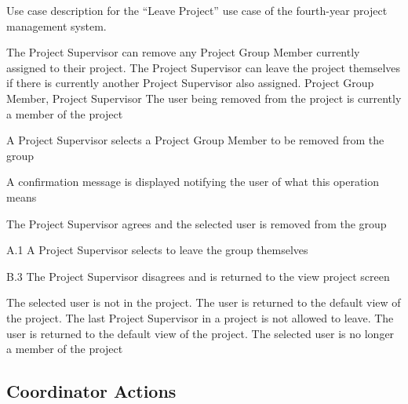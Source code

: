 \documentclass[document.tex]{subfiles}
\begin{document}
\begin{table}
  \centering
  \caption{Use case description for the ``Leave Project'' use case of the fourth-year project management system.}
  \label{tbl:use-case-leave-project}

  \begin{usecase}
    The Project Supervisor can remove any Project Group Member currently assigned to their project. The Project Supervisor can leave the project themselves if there is currently another Project Supervisor also assigned.
    Project Group Member, Project Supervisor
    The user being removed from the project is currently a member of the project
    \ucnormal
    \begin{ucenum}
      \item A Project Supervisor selects a Project Group Member to be removed from the group
      \item A confirmation message is displayed notifying the user of what this operation means
      \item The Project Supervisor agrees and the selected user is removed from the group
    \end{ucenum}
    \begin{ucenum*}
      \item [A.1] A Project Supervisor selects to leave the group themselves
    \end{ucenum*}
    \begin{ucenum}
      \item [B.3] The Project Supervisor disagrees and is returned to the view project screen
    \end{ucenum}
    The selected user is not in the project. The user is returned to the default view of the project.
    The last Project Supervisor in a project is not allowed to leave. The user is returned to the default view of the project.
    The selected user is no longer a member of the project
  \end{usecase}
\end{table}


\FloatBarrier

\subsection{Coordinator Actions}
\label{sec:coordinator-actions}
\end{document}
